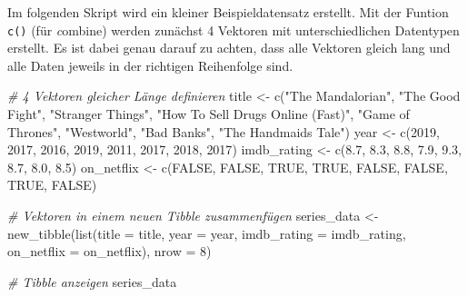 \documentclass[
]{book}
\newenvironment{Shaded}{\begin{snugshade}}{\end{snugshade}}
\newcommand{\AttributeTok}[1]{\textcolor[rgb]{0.77,0.63,0.00}{#1}}
\newcommand{\CommentTok}[1]{\textcolor[rgb]{0.56,0.35,0.01}{\textit{#1}}}
\newcommand{\ConstantTok}[1]{\textcolor[rgb]{0.00,0.00,0.00}{#1}}
\newcommand{\DecValTok}[1]{\textcolor[rgb]{0.00,0.00,0.81}{#1}}
\newcommand{\FloatTok}[1]{\textcolor[rgb]{0.00,0.00,0.81}{#1}}
\newcommand{\FunctionTok}[1]{\textcolor[rgb]{0.00,0.00,0.00}{#1}}
\newcommand{\NormalTok}[1]{#1}
\newcommand{\OtherTok}[1]{\textcolor[rgb]{0.56,0.35,0.01}{#1}}
\newcommand{\StringTok}[1]{\textcolor[rgb]{0.31,0.60,0.02}{#1}}
\begin{document}
Im folgenden Skript wird ein kleiner Beispieldatensatz erstellt. Mit der Funtion \texttt{c()} (für \emph{c}ombine) werden zunächst 4 Vektoren mit unterschiedlichen Datentypen erstellt. Es ist dabei genau darauf zu achten, dass alle Vektoren gleich lang und alle Daten jeweils in der richtigen Reihenfolge sind.

\begin{Shaded}
\begin{Highlighting}[]
\CommentTok{\# 4 Vektoren gleicher Länge definieren}
\NormalTok{title        }\OtherTok{\textless{}{-}} \FunctionTok{c}\NormalTok{(}\StringTok{"The Mandalorian"}\NormalTok{, }\StringTok{"The Good Fight"}\NormalTok{, }\StringTok{"Stranger Things"}\NormalTok{, }
                  \StringTok{"How To Sell Drugs Online (Fast)"}\NormalTok{, }\StringTok{"Game of Thrones"}\NormalTok{,}
                  \StringTok{"Westworld"}\NormalTok{, }\StringTok{"Bad Banks"}\NormalTok{, }\StringTok{"The Handmaid\textquotesingle{}s Tale"}\NormalTok{)}
\NormalTok{year         }\OtherTok{\textless{}{-}} \FunctionTok{c}\NormalTok{(}\DecValTok{2019}\NormalTok{, }\DecValTok{2017}\NormalTok{, }\DecValTok{2016}\NormalTok{, }\DecValTok{2019}\NormalTok{, }\DecValTok{2011}\NormalTok{, }\DecValTok{2017}\NormalTok{, }\DecValTok{2018}\NormalTok{, }\DecValTok{2017}\NormalTok{)}
\NormalTok{imdb\_rating  }\OtherTok{\textless{}{-}} \FunctionTok{c}\NormalTok{(}\FloatTok{8.7}\NormalTok{, }\FloatTok{8.3}\NormalTok{, }\FloatTok{8.8}\NormalTok{, }\FloatTok{7.9}\NormalTok{, }\FloatTok{9.3}\NormalTok{, }\FloatTok{8.7}\NormalTok{, }\FloatTok{8.0}\NormalTok{, }\FloatTok{8.5}\NormalTok{)}
\NormalTok{on\_netflix   }\OtherTok{\textless{}{-}} \FunctionTok{c}\NormalTok{(}\ConstantTok{FALSE}\NormalTok{, }\ConstantTok{FALSE}\NormalTok{, }\ConstantTok{TRUE}\NormalTok{, }\ConstantTok{TRUE}\NormalTok{, }\ConstantTok{FALSE}\NormalTok{, }\ConstantTok{FALSE}\NormalTok{, }\ConstantTok{TRUE}\NormalTok{, }\ConstantTok{FALSE}\NormalTok{)}

\CommentTok{\# Vektoren in einem neuen Tibble zusammenfügen}
\NormalTok{series\_data }\OtherTok{\textless{}{-}} \FunctionTok{new\_tibble}\NormalTok{(}\FunctionTok{list}\NormalTok{(}\AttributeTok{title =}\NormalTok{ title, }
                          \AttributeTok{year =}\NormalTok{ year, }
                          \AttributeTok{imdb\_rating =}\NormalTok{ imdb\_rating, }
                          \AttributeTok{on\_netflix =}\NormalTok{ on\_netflix),}
                          \AttributeTok{nrow =} \DecValTok{8}\NormalTok{) }

\CommentTok{\# Tibble anzeigen}
\NormalTok{series\_data}
\end{Highlighting}
\end{Shaded}
\end{document}
